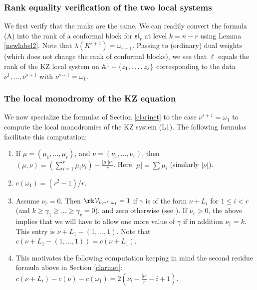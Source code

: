 \subsubsection{Rank equality verification of the two local systems}\label{listy}
We first verify that the ranks are the same.
We can readily convert the formula (A) into the rank of a conformal block for $\mathfrak{sl}_r$  at level $k=n-r$ using Lemma \ref{newlabel2}. Note that $\lambda(K^{s+1})=\omega_{r-1}$. Passing to (ordinary) dual weights (which does not change the rank of conformal blocks), we see that $\ell$ equals the rank of the  KZ local system on $\Bbb{A}^1-\{z_1,\dots,z_s\}$ corresponding to the data $\nu^1,\dots,\nu^{s+1}$ with $\nu^{s+1}=\omega_1$.
\subsubsection{The local monodromy of the KZ equation}
We now specialize  the formulas of Section \ref{clarinet} to the case $\nu^{s+1}=\omega_1$ to compute the local monodromies of the KZ system (L1). The following formulas facilitate this computation:
\begin{enumerate}
\item[(a)] If $\mu=(\mu_1,\dots,\mu_r)$, and $\nu=(\nu_1,\dots,\nu_r)$, then $(\mu,\nu)=(\sum_{i=1}^r\mu_i\nu_i) -\frac{|\mu||\nu|}{r}$. Here $|\mu|=\sum \mu_i$ (similarly $|\nu|$).
\item[(b)] $c(\omega_1)=(r^2-1)/r$.
\item[(c)]  Assume $\nu_r=0$. Then $\rk \mathcal{V}_{\nu,\gamma^*,\omega_1}=1$ if  $\gamma$ is of the form $\nu+L_i$ for $1\leq i<r$ (and $k\geq\gamma_1\geq\dots\geq \gamma_r=0$), and zero otherwise (see \cite{Gepner}). If $\nu_r>0$, the above implies that  we will have to allow one more value of $\gamma$ if in addition  $\nu_1=k$. This entry is $\nu+L_1-(1,\dots,1)$. Note that $c(\nu+L_1-(1,\dots,1))=c(\nu+L_1)$.
\item[(d)] This motivates the following computation keeping in mind the second residue formula above in Section \ref{clarinet}: $c(\nu+L_i)-c(\nu)-c(\omega_1)= 2(\nu_i -\frac{|\nu|}{r} -i +1)$.
\end{enumerate}

